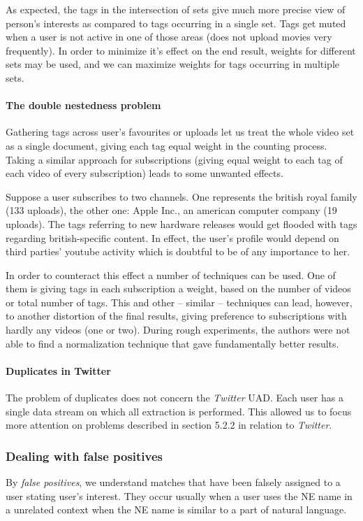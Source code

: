As expected, the tags in the intersection of sets give much more precise view of person's
interests as compared to tags occurring in a single set. Tags get muted when a user is not active in one of
those areas (\eg does not upload movies very frequently). In order to minimize it's effect on the
end result, weights for different sets may be used, and we can maximize weights for tags occurring
in multiple sets.

\paragraph{The double nestedness problem}
Gathering tags across user's favourites or uploads let us treat the whole video
set as a single document, giving each tag equal weight in the counting process.
Taking a similar approach for subscriptions (\eg giving equal weight to each
tag of each video of every subscription) leads to some unwanted effects.

Suppose a user subscribes to two channels. One represents the british royal
family (133 uploads), the other one: Apple Inc., an american computer company
(19 uploads). The tags referring to new hardware releases would get flooded with
tags regarding british-specific content. In effect, the user's profile would
depend on third parties' youtube activity which is doubtful to be of any
importance to her.

In order to counteract this effect a number of techniques can be used. One of
them is giving tags in each subscription a weight, based on the number of videos or
total number of tags. This and other -- similar -- techniques can lead,
however, to another distortion of the final results, giving preference to
subscriptions with hardly any videos (one or two). During rough experiments,
the authors were not able to find a normalization technique that gave
fundamentally better results.

\paragraph{Duplicates in Twitter}
The problem of duplicates does not concern the \textit{Twitter} UAD. Each user has a single
data stream on which all extraction is performed. This allowed us to focus more attention
on problems described in section 5.2.2 in relation to \textit{Twitter}.

\subsubsection{Dealing with false positives}
By \textit{false positives}, we understand matches that have been falsely assigned to a user stating user's interest.
They occur usually when a user uses the NE name in a unrelated context when the NE name is similar to a
part of natural language.

